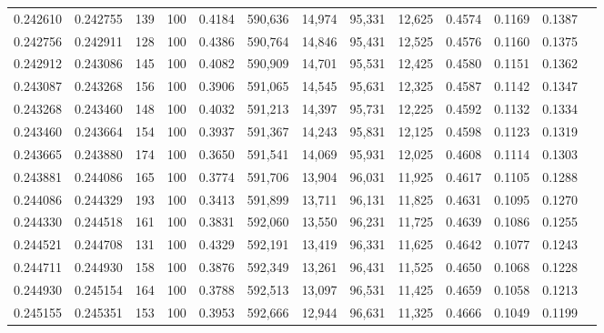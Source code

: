 \begin{tabular}{rrrrrrrrrrrrr}
0.242610 & 0.242755 &   139 & 100 &                                     0.4184 & 590,636 &  14,974 &  95,331 &  12,625 & 0.4574 & 0.1169 & 0.1387 \\
0.242756 & 0.242911 &   128 & 100 &                                     0.4386 & 590,764 &  14,846 &  95,431 &  12,525 & 0.4576 & 0.1160 & 0.1375 \\
0.242912 & 0.243086 &   145 & 100 &                                     0.4082 & 590,909 &  14,701 &  95,531 &  12,425 & 0.4580 & 0.1151 & 0.1362 \\
0.243087 & 0.243268 &   156 & 100 &                                     0.3906 & 591,065 &  14,545 &  95,631 &  12,325 & 0.4587 & 0.1142 & 0.1347 \\
0.243268 & 0.243460 &   148 & 100 &                                     0.4032 & 591,213 &  14,397 &  95,731 &  12,225 & 0.4592 & 0.1132 & 0.1334 \\
0.243460 & 0.243664 &   154 & 100 &                                     0.3937 & 591,367 &  14,243 &  95,831 &  12,125 & 0.4598 & 0.1123 & 0.1319 \\
0.243665 & 0.243880 &   174 & 100 &                                     0.3650 & 591,541 &  14,069 &  95,931 &  12,025 & 0.4608 & 0.1114 & 0.1303 \\
0.243881 & 0.244086 &   165 & 100 &                                     0.3774 & 591,706 &  13,904 &  96,031 &  11,925 & 0.4617 & 0.1105 & 0.1288 \\
0.244086 & 0.244329 &   193 & 100 &                                     0.3413 & 591,899 &  13,711 &  96,131 &  11,825 & 0.4631 & 0.1095 & 0.1270 \\
0.244330 & 0.244518 &   161 & 100 &                                     0.3831 & 592,060 &  13,550 &  96,231 &  11,725 & 0.4639 & 0.1086 & 0.1255 \\
0.244521 & 0.244708 &   131 & 100 &                                     0.4329 & 592,191 &  13,419 &  96,331 &  11,625 & 0.4642 & 0.1077 & 0.1243 \\
0.244711 & 0.244930 &   158 & 100 &                                     0.3876 & 592,349 &  13,261 &  96,431 &  11,525 & 0.4650 & 0.1068 & 0.1228 \\
0.244930 & 0.245154 &   164 & 100 &                                     0.3788 & 592,513 &  13,097 &  96,531 &  11,425 & 0.4659 & 0.1058 & 0.1213 \\
0.245155 & 0.245351 &   153 & 100 &                                     0.3953 & 592,666 &  12,944 &  96,631 &  11,325 & 0.4666 & 0.1049 & 0.1199 \\

\end{tabular}
